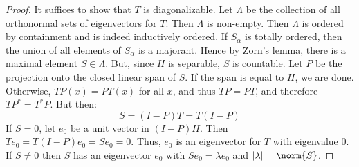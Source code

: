     \begin{proof}
        It suffices to show that $T$ is diagonalizable.
        Let $\Lambda$ be the collection of all orthonormal
        sets of eigenvectors for $T$. Then $\Lambda$ is
        non-empty. Then $\Lambda$ is ordered by containment
        and is indeed inductively ordered. If $S_{\alpha}$ is
        totally ordered, then the union of all elements of
        $S_{\alpha}$ is a majorant. Hence by Zorn's lemma, there
        is a maximal element $S\in\Lambda$. But, since
        $H$ is separable, $S$ is countable. Let $P$ be the
        projection onto the closed linear span of $S$. If
        the span is equal to $H$, we are done. Otherwise,
        $TP(x)=PT(x)$ for all $x$, and thus
        $TP=PT$, and therefore $TP^{*}=T^{*}P$. But then:
        \begin{equation}
            S=(I-P)T=T(I-P)
        \end{equation}
        If $S=0$, let $e_{0}$ be a unit vector in
        $(I-P)H$. Then $Te_{0}=T(I-P)e_{0}=Se_{0}=0$.
        Thus, $e_{0}$ is an eigenvector for $T$ with
        eigenvalue $0$. If $S\ne{0}$ then $S$ has an eigenvector
        $e_{0}$ with $Se_{0}=\lambda{e}_{0}$ and
        $|\lambda|=\norm{S}$.
    \end{proof}
